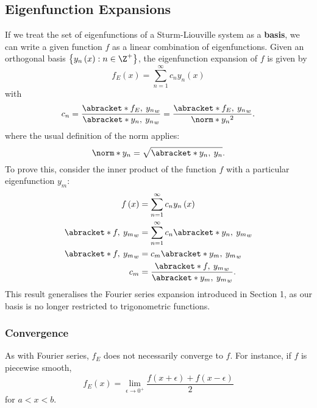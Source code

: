 \documentclass{article}
\begin{document}
\subsection{Eigenfunction Expansions}
If we treat the set of eigenfunctions of a Sturm-Liouville system as
a \textbf{basis}, we can write a given function \(f\) as a linear combination
of eigenfunctions. Given an orthogonal basis \(\left\{ y_n\left( x \right) : n \in \Z^{+} \right\}\),
the eigenfunction expansion of \(f\) is given by
\begin{equation*}
    f_E\left( x \right) = \sum_{n = 1}^\infty c_n y_n\left( x \right)
\end{equation*}
with
\begin{equation*}
    c_n = \frac{\abracket*{f_E,\: y_n}_w}{\abracket*{y_n,\: y_n}_w} = \frac{\abracket*{f_E,\: y_n}_w}{\norm*{y_n}^2}.
\end{equation*}
where the usual definition of the norm applies:
\begin{equation*}
    \norm*{y_n} = \sqrt{\abracket*{y_n,\: y_n}}.
\end{equation*}
To prove this, consider the inner product of the function \(f\) with
a particular eigenfunction \(y_m\):
\begin{align*}
    f\left( x \right)      & = \sum_{n = 1}^\infty c_n y_n\left( x \right)              \\
    \abracket*{f,\: y_m}_w & = \sum_{n = 1}^\infty c_n \abracket*{y_n,\: y_m}_w         \\
    \abracket*{f,\: y_m}_w & = c_m \abracket*{y_m,\: y_m}_w                             \\
    c_m                    & = \frac{\abracket*{f,\: y_m}_w}{\abracket*{y_m,\: y_m}_w}.
\end{align*}
This result generalises the Fourier series expansion introduced in Section 1, as our basis
is no longer restricted to trigonometric functions.
\subsubsection{Convergence}
As with Fourier series, \(f_E\) does not necessarily converge to \(f\). For instance,
if \(f\) is piecewise smooth,
\begin{equation*}
    f_E\left( x \right) = \lim_{\epsilon \to 0^+} \frac{f\left( x + \epsilon \right) + f\left( x - \epsilon \right)}{2}
\end{equation*}
for \(a < x < b\).
\end{document}
